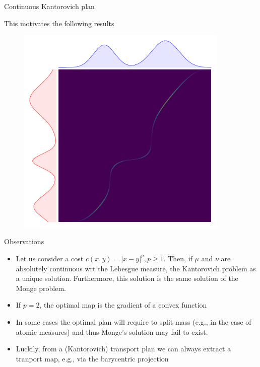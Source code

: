 \documentclass[pdf,aspectratio=169,10pt]{beamer}
\begin{document}
\begin{frame}{ Continuous Kantorovich plan}
\begin{minipage}{0.59\textwidth}
        This motivates the following results
\end{minipage}
\hfill
\begin{minipage}{0.4\textwidth}
\begin{figure}
    \centering
        \includegraphics[width=0.9\textwidth]{../img/kantorovich_continuous_solution.pdf}
    \end{figure}
    \centering
    \small
{}
\end{minipage}
\end{frame}


\begin{frame}{Observations}
    \begin{itemize}
        \item Let us consider a cost $c(x,y) = |x-y|^p, p\geq 1$. Then, if $\mu$ and $\nu$ are absolutely continuous wrt the Lebesgue measure, the Kantorovich problem as a unique solution. Furthermore, this solution is the same solution of the Monge problem.
        \item If $p=2$, the optimal map is the gradient of a convex function
        \item In some cases the optimal plan will require to split mass (e.g., in the case of atomic measures) and thus Monge's solution may fail to exist. 
        \item Luckily, from a (Kantorovich) transport plan we can always extract a tranport map, e.g., via the barycentric projection
    \end{itemize}
\end{frame}
\end{document}

